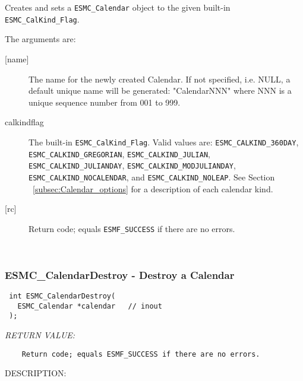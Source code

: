   
    Creates and sets a {\tt ESMC\_Calendar} object to the given built-in
    {\tt ESMC\_CalKind\_Flag}. 
  
    The arguments are:
    \begin{description}
    \item[{[name]}]
      The name for the newly created Calendar.  If not specified, i.e. NULL,
      a default unique name will be generated: "CalendarNNN" where NNN
      is a unique sequence number from 001 to 999.
    \item[calkindflag]
      The built-in {\tt ESMC\_CalKind\_Flag}.  Valid values are:
      \newline
      {\tt ESMC\_CALKIND\_360DAY}, 
      \newline
      {\tt ESMC\_CALKIND\_GREGORIAN},
      \newline
      {\tt ESMC\_CALKIND\_JULIAN}, 
      \newline
      {\tt ESMC\_CALKIND\_JULIANDAY},
      \newline
      {\tt ESMC\_CALKIND\_MODJULIANDAY}, 
      \newline
      {\tt ESMC\_CALKIND\_NOCALENDAR},
      \newline
      and {\tt ESMC\_CALKIND\_NOLEAP}.
      \newline
      See Section ~\ref{subsec:Calendar_options} for a description of each
      calendar kind.
    \item[{[rc]}]
      Return code; equals {\tt ESMF\_SUCCESS} if there are no errors.
    \end{description}
   
 
\mbox{}\hrulefill\ 
 
\subsubsection [ESMC\_CalendarDestroy] {ESMC\_CalendarDestroy - Destroy a Calendar}


  
\begin{verbatim} int ESMC_CalendarDestroy(
   ESMC_Calendar *calendar   // inout
 );
 \end{verbatim}{\em RETURN VALUE:}
\begin{verbatim}    Return code; equals ESMF_SUCCESS if there are no errors.\end{verbatim}
{\sf DESCRIPTION:\\ }


